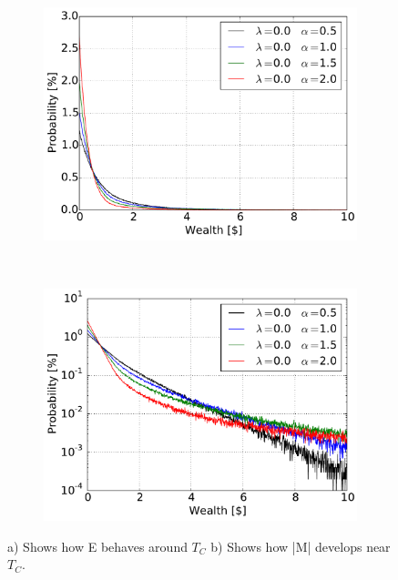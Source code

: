 \begin{figure}[H]
    \centering
    \begin{subfigure}{0.5\textwidth}
        \centering
        \includegraphics[width=\linewidth]{result/bilder/5d-00}
        \caption{}
    \end{subfigure}%
    ~ 
    \begin{subfigure}{0.5\textwidth}
        \centering
        \includegraphics[width=\linewidth]{result/bilder/5d-00-log}
        \caption{}
    \end{subfigure}
    \caption{a) Shows how E behaves around $T_C$ b) Shows how |M| develops near $T_C$.}
    \label{fig:5d-00}
\end{figure}




